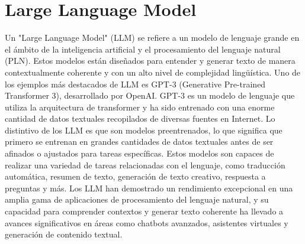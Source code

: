 \section{Large Language Model}
Un "Large Language Model" (LLM) se refiere a un modelo de lenguaje grande en el ámbito de la inteligencia artificial y el procesamiento del lenguaje natural (PLN). Estos modelos están diseñados para entender y generar texto de manera contextualmente coherente y con un alto nivel de complejidad lingüística.
Uno de los ejemplos más destacados de LLM es GPT-3 (Generative Pre-trained Transformer 3), desarrollado por OpenAI. GPT-3 es un modelo de lenguaje que utiliza la arquitectura de transformer y ha sido entrenado con una enorme cantidad de datos textuales recopilados de diversas fuentes en Internet.
Lo distintivo de los LLM es que son modelos preentrenados, lo que significa que primero se entrenan en grandes cantidades de datos textuales antes de ser afinados o ajustados para tareas específicas. Estos modelos son capaces de realizar una variedad de tareas relacionadas con el lenguaje, como traducción automática, resumen de texto, generación de texto creativo, respuesta a preguntas y más.
Los LLM han demostrado un rendimiento excepcional en una amplia gama de aplicaciones de procesamiento del lenguaje natural, y su capacidad para comprender contextos y generar texto coherente ha llevado a avances significativos en áreas como chatbots avanzados, asistentes virtuales y generación de contenido textual.

